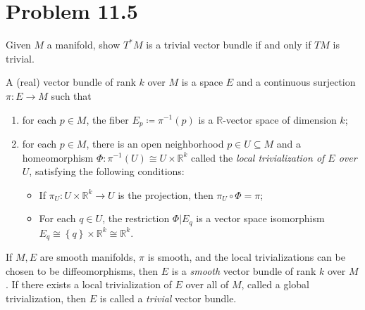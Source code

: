 \documentclass[11pt, letterpaper]{article}
\begin{document}
\section{Problem 11.5}\label{11.5}
\begin{problem}
	Given $M$ a manifold, show $T^*M$ is a trivial vector bundle if and only if $TM$ is trivial.
\end{problem}
\begin{remark}
	A (real) vector bundle of rank $k$ over $M$ is a space $E$ and a continuous surjection $\pi : E \to M$ such that
	\begin{enumerate}
		\item for each $p\in M$, the fiber $E_p \coloneqq \pi ^{-1} (p)$ is a $\mathbb{R} $-vector space of dimension $k$;
		\item for each $p\in M$, there is an open neighborhood $p\in U\subseteq M$ and a homeomorphism $\Phi : \pi ^{-1} (U) \cong U\times \mathbb{R} ^k$ called the \emph{local trivialization of $E$ over $U$}, satisfying the following conditions:
			\begin{itemize}
				\item If $\pi _U : U\times \mathbb{R} ^k \to U$ is the projection, then $\pi _U \circ \Phi =\pi $;
				\item For each $q\in U$, the restriction $\Phi |E_q$ is a vector space isomorphism $E_q \cong \left\{ q \right\} \times \mathbb{R}^k \cong \mathbb{R} ^k$.
			\end{itemize}
	\end{enumerate}
	If $M,E$ are smooth manifolds, $\pi $ is smooth, and the local trivializations can be chosen to be diffeomorphisms, then $E$ is a \emph{smooth} vector bundle of rank $k$ over $M$. If there exists a local trivialization of $E$ over all of $M$, called a global trivialization, then $E$ is called a \emph{trivial} vector bundle.
\end{remark}
\end{document}
